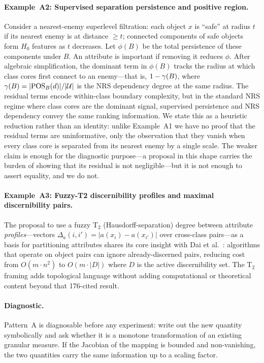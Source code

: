 \paragraph{Example~A2: Supervised separation persistence and positive region.}
Consider a nearest-enemy superlevel filtration: each object $x$ is
``safe'' at radius $t$ if its nearest enemy is at distance $\geq t$;
connected components of safe objects form $H_0$ features as $t$ decreases.
Let $\phi(B)$ be the total persistence of these components under $B$.
An attribute is important if removing it reduces $\phi$.  After algebraic
simplification, the dominant term in $\phi(B)$ tracks the radius at which
class cores first connect to an enemy---that is, $1 - \gamma(B)$, where
$\gamma(B) = |\mathrm{POS}_B(d)|/|\mathcal{U}|$ is the NRS dependency degree at the same
radius.  The residual terms encode within-class boundary complexity, but
in the standard NRS regime where class cores are the dominant signal,
supervised persistence and NRS dependency convey the same ranking
information.  We state this as a heuristic reduction rather than an
identity: unlike Example~A1 we have no proof that the residual terms are
uninformative, only the observation that they vanish when every class core
is separated from its nearest enemy by a single scale.  The weaker claim is
enough for the diagnostic purpose---a proposal in this shape carries the
burden of showing that its residual is not negligible---but it is not
enough to assert equality, and we do not.

\paragraph{Example~A3: Fuzzy-T2 discernibility profiles and maximal
discernibility pairs.}
The proposal to use a fuzzy T$_2$ (Hausdorff-separation) degree between
attribute \emph{profiles}---vectors $\Delta_a(i,i') = |a(x_i)-a(x_{i'})|$
over cross-class pairs---as a basis for partitioning attributes shares its
core insight with Dai et al.~\cite{Dai2018TFS}: algorithms that operate on
object pairs can ignore already-discerned pairs, reducing cost from $O(m \cdot n^2)$
to $O(m\cdot|D|)$ where $D$ is the active discernibility set.
The T$_2$ framing adds topological language without adding
computational or theoretical content beyond that 176-cited result.

\paragraph{Diagnostic.}
Pattern~A is diagnosable before any experiment: write out the new quantity
symbolically and ask whether it is a monotone transformation of an existing
granular measure.  If the Jacobian of the mapping is bounded and non-vanishing,
the two quantities carry the same information up to a scaling factor.

